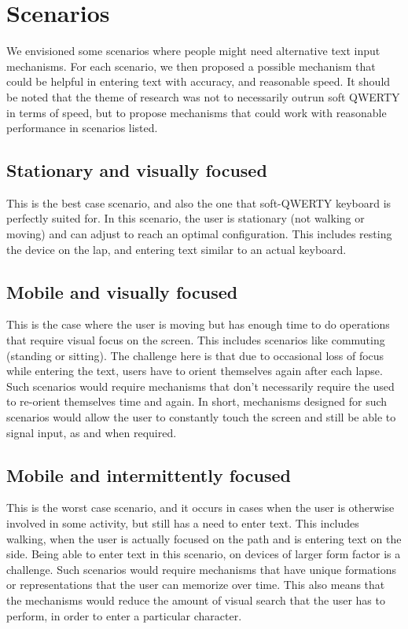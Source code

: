 \section{Scenarios}

We envisioned some scenarios where people might need alternative text
input mechanisms. For each scenario, we then proposed a possible
mechanism that could be helpful in entering text with accuracy, and
reasonable speed. It should be noted that the theme of research was
not to necessarily outrun soft QWERTY in terms of speed, but to
propose mechanisms that could work with reasonable performance in
scenarios listed.

\subsection{Stationary and visually focused}

This is the best case scenario, and also the one that soft-QWERTY
keyboard is perfectly suited for. In this scenario, the user is
stationary (not walking or moving) and can adjust to reach an optimal
configuration. This includes resting the device on the lap, and
entering text similar to an actual keyboard.

\subsection{Mobile and visually focused}

This is the case where the user is moving but has enough time to do
operations that require visual focus on the screen. This includes
scenarios like commuting (standing or sitting). The challenge here is
that due to occasional loss of focus while entering the text, users
have to orient themselves again after each lapse. Such scenarios would
require mechanisms that don't necessarily require the used to
re-orient themselves time and again. In short, mechanisms designed for
such scenarios would allow the user to constantly touch the screen and
still be able to signal input, as and when required.

\subsection{Mobile and intermittently focused}

This is the worst case scenario, and it occurs in cases when the user
is otherwise involved in some activity, but still has a need to enter
text. This includes walking, when the user is actually focused on the
path and is entering text on the side. Being able to enter text in
this scenario, on devices of larger form factor is a challenge. Such
scenarios would require mechanisms that have unique formations or
representations that the user can memorize over time. This also means
that the mechanisms would reduce the amount of visual search that the
user has to perform, in order to enter a particular character.
 
